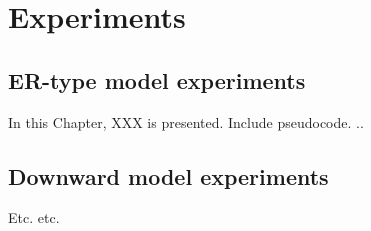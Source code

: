 
\chapter{Experiments}\label{chap:experiments}

\section{ER-type model experiments}

In this Chapter, XXX is presented. Include pseudocode. 
..

\section{Downward model experiments}\label{sec:experiments:downward model}

Etc. etc.

